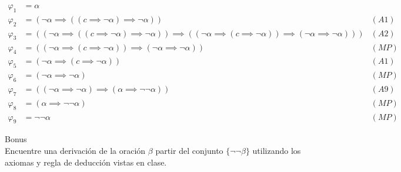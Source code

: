\begin{sol}
    \begin{align*}
        \varphi_1 & = \alpha                                                                                                                                                                             \\
        \varphi_2 & = (\neg \alpha \implies ((c \implies \neg \alpha )\implies \neg \alpha))                                                                                                      & (A1) \\
        \varphi_3 & = ((\neg \alpha \implies ((c \implies \neg \alpha)\implies \neg \alpha))\implies ((\neg \alpha \implies (c \implies \neg \alpha))\implies(\neg \alpha \implies \neg \alpha))) & (A2) \\
        \varphi_4 & = ((\neg \alpha \implies (c \implies \neg \alpha))\implies (\neg \alpha \implies \neg \alpha))                                                                                & (MP) \\
        \varphi_5 & = (\neg \alpha \implies (c \implies \neg \alpha))                                                                                                                             & (A1) \\
        \varphi_6 & = (\neg \alpha \implies \neg \alpha)                                                                                                                                          & (MP) \\
        \varphi_7 & = ((\neg \alpha \implies \neg \alpha) \implies (\alpha \implies \neg \neg \alpha))                                                                                            & (A9) \\
        \varphi_8 & = (\alpha \implies \neg \neg \alpha)                                                                                                                                          & (MP) \\
        \varphi_9 & = \neg \neg \alpha                                                                                                                                                            & (MP)
    \end{align*}
\end{sol}

\begin{prob}
    Bonus
    \\
    Encuentre una derivación de la oración $\beta$  partir del conjunto $\{\neg \neg \beta\}$ utilizando los axiomas y regla de deducción vistas en clase.
\end{prob}

